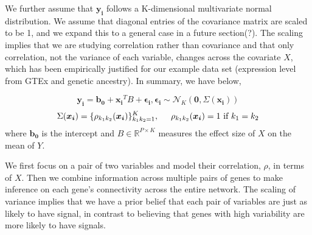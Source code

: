 \documentclass[12pt]{extarticle}
\theoremstyle{theorem}
\begin{document}
\vspace{4mm}
\noindent We further assume that $\bm{y_i}$ follows a K-dimensional multivariate normal distribution. We assume that diagonal entries of the covariance matrix are scaled to be 1, and we expand this to a general case in a future section(?). The scaling implies that we are studying correlation rather than covariance and that only correlation, not the variance of each variable, changes across the covariate $X$, which has been empirically justified for our example data set (expression level from GTEx and genetic ancestry). %
In summary, we have below,

\begin{equation}
\bm{y_i} = \bm{b_0} + \bm{x_i}^TB + \bm{\epsilon_i}, \bm{\epsilon_i} \sim \mathcal{N}_K(\bm{0}, \Sigma(\bm{x_i}))
\label{eq1}
\end{equation}
$$\Sigma (\bm{x_i}) = \{\rho_{k_1k_2}(\bm{x_i})\}_{k_1k_2 = 1}^K, \hspace{5mm} \rho_{k_1k_2}(\bm{x_i}) = 1 \text{  if  } k_1 = k_2$$
where $\bm{b_0}$ is the intercept and $B\in \mathbb{R}^{P \times K}$ measures the effect size of $X$ on the mean of $Y$. %

\vspace{5mm} \noindent
We first focus on a pair of two variables and model their correlation, $\rho$, in terms of $X$. Then we combine information across multiple pairs of genes to make inference on each gene's connectivity across the entire network. The scaling of variance implies that we have a prior belief that each pair of variables are just as likely to have signal, in contrast to believing that genes with high variability are more likely to have signals.
\end{document}
